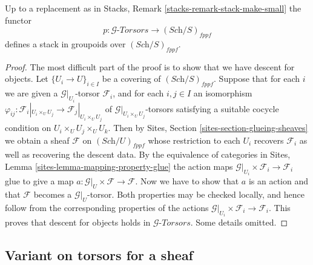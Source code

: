 \begin{lemma}
\label{lemma-torsors-sheaf-stack-in-groupoids}
Up to a replacement as in
Stacks, Remark \ref{stacks-remark-stack-make-small}
the functor
$$
p : \mathcal{G}\textit{-Torsors} \longrightarrow (\textit{Sch}/S)_{fppf}
$$
defines a stack in groupoids over $(\textit{Sch}/S)_{fppf}$.
\end{lemma}

\begin{proof}
The most difficult part of the proof is to show that
we have descent for objects.
Let $\{U_i \to U\}_{i \in I}$ be a covering of $(\textit{Sch}/S)_{fppf}$.
Suppose that for each $i$ we are given a $\mathcal{G}|_{U_i}$-torsor
$\mathcal{F}_i$, and for each $i, j \in I$ an isomorphism
$\varphi_{ij} :
\mathcal{F}_i|_{U_i \times_U U_j} \to \mathcal{F}_j|_{U_i \times_U U_j}$
of $\mathcal{G}|_{U_i \times_U U_j}$-torsors
satisfying a suitable cocycle condition on $U_i \times_U U_j \times_U U_k$.
Then by
Sites, Section \ref{sites-section-glueing-sheaves}
we obtain a sheaf $\mathcal{F}$ on $(\textit{Sch}/U)_{fppf}$
whose restriction to each $U_i$ recovers $\mathcal{F}_i$ as well
as recovering the descent data. By the equivalence of categories in
Sites, Lemma \ref{sites-lemma-mapping-property-glue}
the action maps $\mathcal{G}|_{U_i} \times \mathcal{F}_i \to \mathcal{F}_i$
glue to give a map $a : \mathcal{G}|_U \times \mathcal{F} \to \mathcal{F}$.
Now we have to show that $a$ is an action and that $\mathcal{F}$ becomes
a $\mathcal{G}|_U$-torsor. Both properties may be checked locally, and
hence follow from the corresponding properties of the actions
$\mathcal{G}|_{U_i} \times \mathcal{F}_i \to \mathcal{F}_i$.
This proves that descent for objects holds in
$\mathcal{G}\textit{-Torsors}$.
Some details omitted.
\end{proof}



\subsection{Variant on torsors for a sheaf}
\label{subsection-variant-torsor-sheaf}

